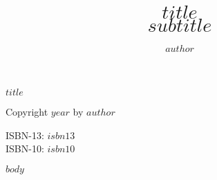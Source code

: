 \documentclass[11pt]{memoir}
\makeatletter
\newcommand{\verbatimfont}[1]{\def\verbatim@font{#1}}%
\makeatother
\begin{document}
\verbatimfont{\fontfamily{beramono}\ttfamily\footnotesize\selectfont}

\sloppybottom %
\pagestyle{Ruled}
\renewcommand\chaptermark[1]{%
  \markboth{\MakeUppercase{#1}}{}
}
\frontmatter

%

\title{\HUGE\textbf{\textsf{$title$}}\\ \vspace*{10pt} \Large \textit{$subtitle$}}

\author{$author$}
\date{}

\maketitle

\pagebreak
\vfill

\noindent
{\Large{\textbf{\textsc{$title$}}}}\\
\begin{small}
Copyright \textcopyright $year$ by $author$
\vspace{.5cm}

\noindent

\vspace{20pt}

\noindent
ISBN-13: $isbn13$\\
ISBN-10: $isbn10$

\vspace{20pt}


\vspace{30pt}



\vfill

\end{small}

\thispagestyle{empty}


\pagebreak

\clearpage
\tableofcontents*
\clearpage



%

\mainmatter


$body$ 




\end{document}
